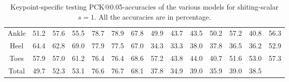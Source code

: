 \documentclass[./main.tex]{subfiles}
\begin{document}
\begin{table}[htbp]
\begin{adjustbox}{center}
\begin{tabular}{c||ccc|ccc|ccc|ccc|c}
            Ankle & 51.2 & 57.6 & 55.5 & 78.7 & 78.9 & 67.8 & 49.9 & 43.7 & 43.5 & 50.2 & 57.2 & 40.8 & 56.3 \\
            Heel & 64.4 & 62.8 & 69.0 & 77.9 & 77.5 & 67.0 & 34.3 & 33.3 & 38.0 & 37.8 & 36.5 & 36.2 & 52.9 \\
            Toes & 57.9 & 57.0 & 61.2 & 76.4 & 76.4 & 68.6 & 57.2 & 43.8 & 44.0 & 40.7 & 51.6 & 53.0 & 57.3 \\
            \hline
            Total & 49.7 & 52.3 & 53.1 & 76.6 & 76.7 & 68.1 & 37.8 & 34.9 & 39.0 & 35.9 & 39.0 & 38.5 & \\
            \hline
        \end{tabular}
        \caption{Keypoint-specific testing PCK@0.05-accuracies of the various models for shiting-scalar $s = 1$. All the accuracies are in percentage.}
        \label{tab:finetune_kpts_test_accs_05_1}
    \end{adjustbox}
\end{table}
\end{document}
